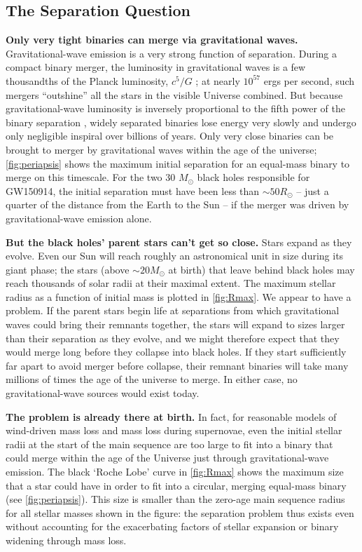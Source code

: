 \documentclass[iop,onecolumn]{revtex4-1}
\begin{document}
\subsection{The Separation Question}


\textbf{Only very tight binaries can merge via gravitational waves.} Gravitational-wave emission is a very strong function of separation. During a compact binary merger, the luminosity in gravitational waves is a few thousandths of the Planck luminosity, $c^5/G$ \citep[e.g.,][]{Cardoso:2018}; at nearly $10^{57}$ ergs per second, such mergers ``outshine'' all the stars in the visible Universe combined. But because gravitational-wave luminosity is inversely proportional to the fifth power of the binary separation \citep{Peters:1964}, widely separated binaries lose energy very slowly and undergo only negligible inspiral over billions of years. Only very close binaries can be brought to merger by gravitational waves within the age of the universe; \autoref{fig:periapsis} shows the maximum initial separation for an equal-mass binary to merge on this timescale. For the two 30 $M_\odot$ black holes responsible for GW150914, the initial separation must have been less than $\sim 50 R_\odot$ -- just a quarter of the distance from the Earth to the Sun -- if the merger was driven by gravitational-wave emission alone.


\textbf{But the black holes' parent stars can't get so close.} Stars expand as they evolve. Even our Sun will reach roughly an astronomical unit in size during its giant phase; the stars (above $\sim 20 M_\odot$  at birth) that leave behind black holes may reach thousands of solar radii at their maximal extent. The maximum stellar radius as a function of initial mass is plotted in \autoref{fig:Rmax}. We appear to have a problem. If the parent stars begin life at separations from which gravitational waves could bring their remnants together, the stars will expand to sizes larger than their separation as they evolve, and we might therefore expect that they would merge long before they collapse into black holes. If they start sufficiently far apart to avoid merger before collapse, their remnant binaries will take many millions of times the age of the universe to merge. In either case, no gravitational-wave sources would exist today. 

\textbf{The problem is already there at birth.} In fact, for reasonable models of wind-driven mass loss and mass loss during supernovae, even the initial stellar radii at the start of the main sequence are too large to fit into a binary that could merge within the age of the Universe just through gravitational-wave emission.  The black `Roche Lobe' curve in \autoref{fig:Rmax} shows the maximum size that a star could have in order to fit into a circular, merging equal-mass binary (see \autoref{fig:periapsis}).  This size is smaller than the zero-age main sequence radius for all stellar masses shown in the figure: the separation problem thus exists even without accounting for the exacerbating factors of stellar expansion or binary widening through mass loss.
\end{document}
